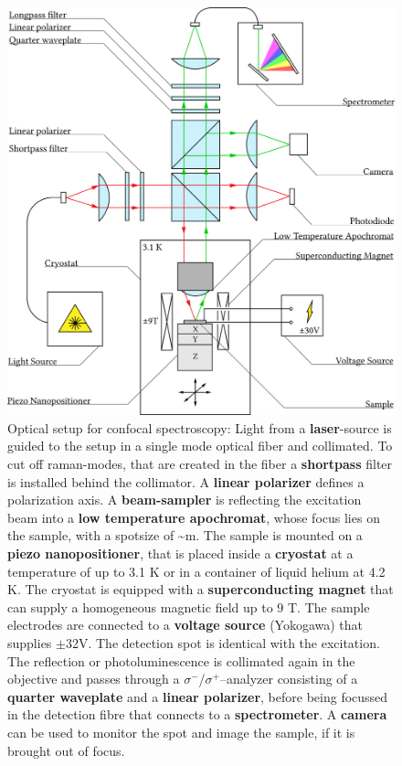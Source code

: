 \begin{figure}
	\centering
	\includegraphics[width=.8\textwidth]{OptischerAufbau.png}
	\caption{Optical setup for confocal spectroscopy: Light from a \textbf{laser}-source is guided to the setup in a single mode optical fiber and collimated. To cut off raman-modes, that are created in the fiber a \textbf{shortpass} filter is installed behind the collimator. A \textbf{linear polarizer} defines a polarization axis. A \textbf{beam-sampler} is reflecting the excitation beam into a \textbf{low temperature apochromat}, whose focus lies on the sample, with a spotsize of \textasciitilde{}\mu m. The sample is mounted on a \textbf{piezo nanopositioner}, that is placed inside a \textbf{cryostat} at a temperature of up to 3.1 K or in a container of liquid helium at 4.2 K. The cryostat is equipped with a \textbf{superconducting magnet} that can supply a homogeneous magnetic field up to 9 T. The sample electrodes are connected to a \textbf{voltage source} (Yokogawa) that supplies {\small$\pm$}32V. The detection spot is identical with the excitation. The reflection or photoluminescence is collimated again in the objective and passes through a $\sigma^-$/$\sigma^+$--analyzer consisting of a \textbf{quarter waveplate} and a \textbf{linear polarizer}, before being focussed in the detection fibre that connects to a \textbf{spectrometer}. A \textbf{camera} can be used to monitor the spot and image the sample, if it is brought out of focus.}
	\label{opticalsetup}
\end{figure}

